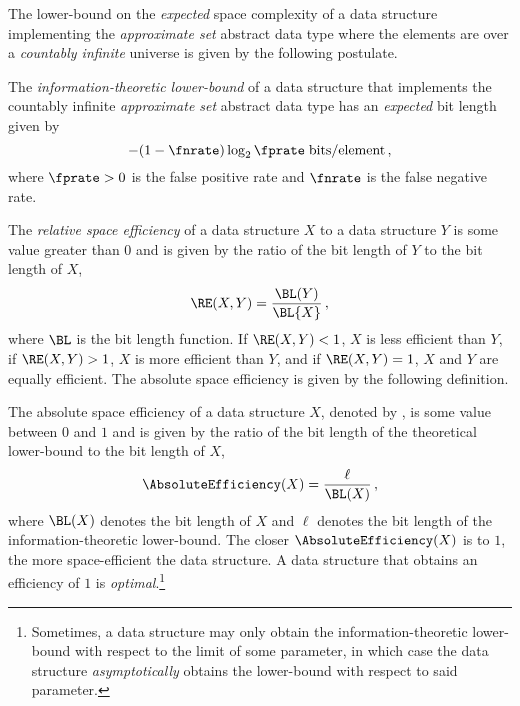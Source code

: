 \documentclass[ ../main.tex]{subfiles}
\begin{document}
The lower-bound on the \emph{expected} space complexity of a data structure 
implementing the \emph{approximate set} abstract data type where the elements 
are over a \emph{countably infinite} universe is given by the following 
postulate.
\begin{postulate}
\label{pst:approx_l_b}
The \emph{information-theoretic lower-bound} of a data structure that implements the countably infinite 
\emph{approximate set} abstract data type has an \emph{expected} bit length 
given by
\begin{equation}
    -(1 - \fnrate) \log_2 \fprate \; \si{bits \per element}\,,
\end{equation}
where $\fprate > 0$ is the false positive rate and 
$\fnrate$ is the false negative rate.
\end{postulate}

The \emph{relative space efficiency} of a data 
structure $X$ to a data structure $Y$ is some value 
greater than $0$ and is given by the ratio of the bit length of $Y$ to the bit 
length of $X$,
\begin{equation}
    \RE(X,Y) = \frac{\BL(Y)}{\BL{X}}\,,
\end{equation}
where $\BL$ is the bit length function. If $\RE(X,Y) < 1$, $X$ is less efficient 
than $Y$, if $\RE(X,Y) > 1$, $X$ is more efficient than $Y$, and if 
$\RE(X,Y) = 1$, $X$ and $Y$ are equally efficient. The absolute space efficiency 
is given by the following definition.
\begin{definition}
The absolute space efficiency of a data structure $X$, denoted by 
, is some value between $0$ and $1$ and is given by the 
ratio of the bit length of the theoretical lower-bound to the bit length of $X$,
\begin{equation}
    \AbsoluteEfficiency(X) = \frac{\ell}{\BL(X)}\,,
\end{equation}
where $\BL(X)$ denotes the bit length of $X$ and $\ell$ denotes the bit length 
of the information-theoretic lower-bound. The closer $\AbsoluteEfficiency(X)$ is 
to $1$, the more space-efficient the data structure. A data structure that 
obtains an efficiency of $1$ is \emph{optimal}.\footnote{Sometimes, a data 
structure may only obtain the information-theoretic lower-bound with respect to 
the limit of some parameter, in which case the data structure 
\emph{asymptotically} obtains the lower-bound with respect to said parameter.}
\end{definition}
\end{document}
